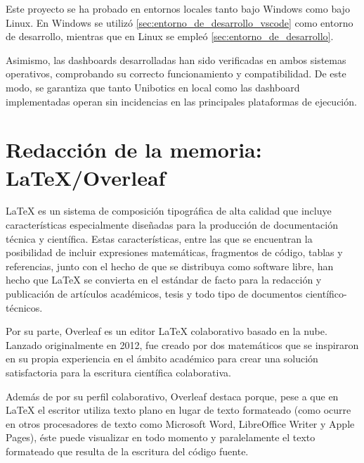 \documentclass[a4paper, 12pt]{book}
\begin{document}
Este proyecto  se ha probado en entornos locales tanto bajo Windows como bajo Linux.  
En Windows se utilizó \ref{sec:entorno_de_desarrollo_vscode} como entorno de desarrollo, mientras que en Linux se empleó \ref{sec:entorno_de_desarrollo}.

Asimismo, las dashboards desarrolladas han sido verificadas en ambos sistemas operativos, comprobando su correcto funcionamiento y compatibilidad.  
De este modo, se garantiza que tanto Unibotics en local como las dashboard implementadas operan sin incidencias en las principales plataformas de ejecución.  

\section{Redacción de la memoria: LaTeX/Overleaf}
\label{sec:redaccion_de_la_memoria}

LaTeX es un sistema de composición tipográfica de alta calidad que incluye características especialmente diseñadas para la producción de documentación técnica y científica. Estas características, entre las que se encuentran la posibilidad de incluir expresiones matemáticas, fragmentos de código, tablas y referencias, junto con el hecho de que se distribuya como software libre, han hecho que LaTeX se convierta en el estándar de facto para la redacción y publicación de artículos académicos, tesis y todo tipo de documentos científico-técnicos. 

Por su parte, Overleaf es un editor LaTeX colaborativo basado en la nube. Lanzado originalmente en 2012, fue creado por dos matemáticos que se inspiraron en su propia experiencia en el ámbito académico para crear una solución satisfactoria para la escritura científica colaborativa.

Además de por su perfil colaborativo, Overleaf destaca porque, pese a que en LaTeX el escritor utiliza texto plano en lugar de texto formateado (como ocurre en otros procesadores de texto como Microsoft Word, LibreOffice Writer y Apple Pages), éste puede visualizar en todo momento y paralelamente el texto formateado que resulta de la escritura del código fuente.

\cleardoublepage

\end{document}
